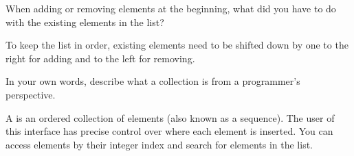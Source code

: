 \Q When adding or removing elements at the beginning, what did you have to do with the existing elements in the list?

\begin{answer}
To keep the list in order, existing elements need to be shifted down by one to the right for adding and to the left for removing.
\end{answer}


\Q In your own words, describe what a  collection is from a programmer's perspective.

\begin{answer}[5em]
A  is an ordered collection of elements (also known as a sequence).
The user of this interface has precise control over where  each element is inserted.
You can access elements by their integer index and search for elements in the list.
\end{answer}
